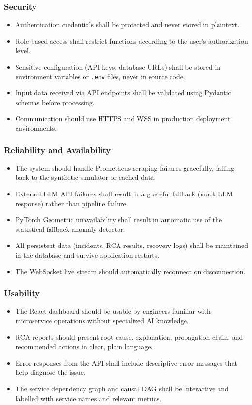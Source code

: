 \documentclass[11pt,a4paper]{article}
\begin{document}
\subsubsection{Security}
\begin{itemize}
    \item Authentication credentials shall be protected and never stored in plaintext.
    \item Role-based access shall restrict functions according to the user's authorization level.
    \item Sensitive configuration (API keys, database URLs) shall be stored in environment variables or \texttt{.env} files, never in source code.
    \item Input data received via API endpoints shall be validated using Pydantic schemas before processing.
    \item Communication should use HTTPS and WSS in production deployment environments.
\end{itemize}

\subsubsection{Reliability and Availability}
\begin{itemize}
    \item The system should handle Prometheus scraping failures gracefully, falling back to the synthetic simulator or cached data.
    \item External LLM API failures shall result in a graceful fallback (mock LLM response) rather than pipeline failure.
    \item PyTorch Geometric unavailability shall result in automatic use of the statistical fallback anomaly detector.
    \item All persistent data (incidents, RCA results, recovery logs) shall be maintained in the database and survive application restarts.
    \item The WebSocket live stream should automatically reconnect on disconnection.
\end{itemize}

\subsubsection{Usability}
\begin{itemize}
    \item The React dashboard should be usable by engineers familiar with microservice operations without specialized AI knowledge.
    \item RCA reports should present root cause, explanation, propagation chain, and recommended actions in clear, plain language.
    \item Error responses from the API shall include descriptive error messages that help diagnose the issue.
    \item The service dependency graph and causal DAG shall be interactive and labelled with service names and relevant metrics.
\end{itemize}
\end{document}
